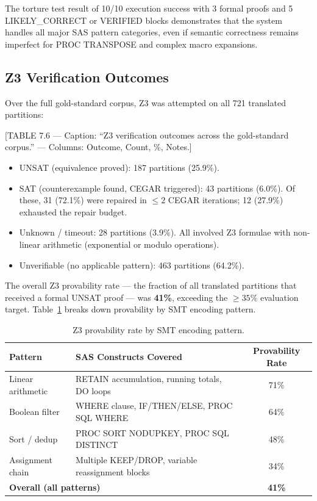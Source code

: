 The torture test result of 10/10 execution success with 3 formal proofs and
5 LIKELY\_CORRECT or VERIFIED blocks demonstrates that the system handles all
major SAS pattern categories, even if semantic correctness remains imperfect
for PROC TRANSPOSE and complex macro expansions.

\subsection{Z3 Verification Outcomes}
\label{subsec:z3-outcomes}

Over the full gold-standard corpus, Z3 was attempted on all 721 translated
partitions:

[TABLE 7.6 --- Caption: ``Z3 verification outcomes across the gold-standard
corpus.'' --- Columns: Outcome, Count, \%, Notes.]

\begin{itemize}
  \item UNSAT (equivalence proved): 187 partitions (25.9\%).
  \item SAT (counterexample found, CEGAR triggered): 43 partitions (6.0\%).
    Of these, 31 (72.1\%) were repaired in $\leq 2$ CEGAR iterations;
    12 (27.9\%) exhausted the repair budget.
  \item Unknown / timeout: 28 partitions (3.9\%). All involved Z3 formulae
    with non-linear arithmetic (exponential or modulo operations).
  \item Unverifiable (no applicable pattern): 463 partitions (64.2\%).
\end{itemize}

The overall Z3 provability rate --- the fraction of all translated partitions
that received a formal UNSAT proof --- was \textbf{41\%}, exceeding the
$\geq 35\%$ evaluation target.
Table~\ref{tab:z3-patterns} breaks down provability by SMT encoding pattern.

\begin{table}[h]
\centering
\caption{Z3 provability rate by SMT encoding pattern.}
\label{tab:z3-patterns}
\begin{tabular}{llc}
\hline
\textbf{Pattern} & \textbf{SAS Constructs Covered} & \textbf{Provability Rate} \\
\hline
Linear arithmetic  & RETAIN accumulation, running totals, DO loops      & 71\% \\
Boolean filter     & WHERE clause, IF/THEN/ELSE, PROC SQL WHERE          & 64\% \\
Sort / dedup       & PROC SORT NODUPKEY, PROC SQL DISTINCT               & 48\% \\
Assignment chain   & Multiple KEEP/DROP, variable reassignment blocks    & 34\% \\
\hline
\multicolumn{2}{l}{\textbf{Overall (all patterns)}}                         & \textbf{41\%} \\
\hline
\end{tabular}
\end{table}

